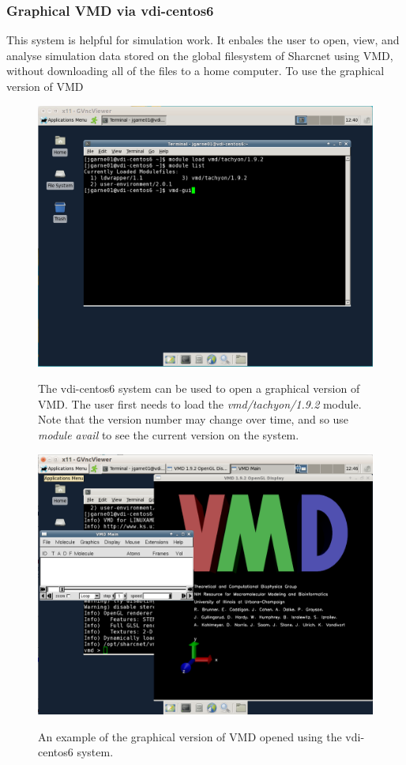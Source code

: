 \documentclass[12pt]{article}
\begin{document}
\subsubsection{Graphical VMD via vdi-centos6}

\quad This system is helpful for simulation work. It enbales the user to open, view, and analyse simulation data stored on the global filesystem of Sharcnet using VMD, without downloading all of the files to a home computer. To use the graphical version of VMD

\begin{figure}[H]
\centering
\caption{The vdi-centos6 system can be used to open a graphical version of VMD. The user first needs to load the \textit{vmd/tachyon/1.9.2} module. Note that the version number may change over time, and so use \textit{module avail} to see the current version on the system.}
\includegraphics[width=\textwidth]{vdi-load-vmd}
\label{vdi-load-vmd}
\end{figure}

\begin{figure}[H]
\centering
\caption{An example of the graphical version of VMD opened using the vdi-centos6 system.}
\includegraphics[width=\textwidth]{vdi-vmd-gui}
\label{vdi-vmd-gui}
\end{figure}
\end{document}
